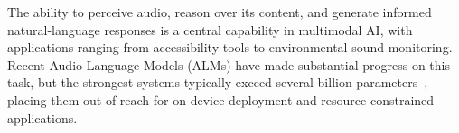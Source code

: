 \documentclass[cameraready]{Interspeech}
\begin{document}




The ability to perceive audio, reason over its content, and generate informed natural-language responses is a central capability in multimodal AI, with applications ranging from accessibility tools to environmental sound monitoring. Recent Audio-Language Models (ALMs) have made substantial progress on this task, but the strongest systems typically exceed several billion parameters~\cite{tang2024salmonn, gong2024listen, chu2024qwen2audio}, placing them out of reach for on-device deployment and resource-constrained applications.
\end{document}
